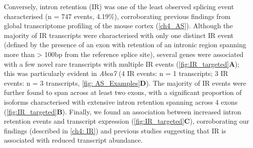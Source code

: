 \newpage
Conversely, intron retention (IR) was one of the least observed splicing event characterised (n = 747 events, 4.19\%), corroborating previous findings from global transcriptome profiling of the mouse cortex (\cref{ch4_AS}). Although the majority of IR transcripts were characterised with only one distinct IR event (defined by the presence of an exon with retention of an intronic region spanning more than > 100bp from the reference splice site), several genes were associated with a few novel rare transcripts with multiple IR events (\cref{fig:IR_targeted}\textbf{A}); this was particularly evident in \textit{Abca7} (4 IR events: n = 1 transcripts; 3 IR events: n = 3 transcripts, \cref{fig: AS_Examples}\textbf{D}). The majority of IR events were further found to span across at least two exons, with a significant proportion of isoforms characterised with extensive intron retention spanning across 4 exons (\cref{fig:IR_targeted}\textbf{B}). Finally, we found an association between increased intron retention events and transcript expression (\cref{fig:IR_targeted}\textbf{C}), corroborating our findings (described in \cref{ch4: IR}) and previous studies\cite{Braunschweig2014} suggesting that IR is associated with reduced transcript abundance.

